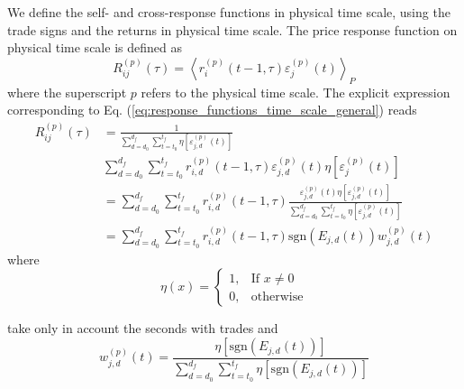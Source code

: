 We define the self- and cross-response functions in physical time scale, using
the trade signs and the returns in physical time scale. The price response
function on physical time scale is defined as
\begin{equation}\label{eq:response_functions_time_scale_general}
    R^{\left(p\right)}_{ij}\left(\tau\right)=\left\langle r^{\left(p\right)}
    _{i}\left(t-1, \tau\right) \varepsilon_{j}^{\left(p\right)} \left(t\right)
    \right\rangle _{P}
\end{equation}
where the superscript $p$ refers to the physical time scale. The explicit
expression corresponding to Eq.
(\ref{eq:response_functions_time_scale_general}) reads
\begin{align}\label{eq:response_seconds_explicit}
    R_{ij}^{\left(p\right)}\left(\tau\right)&=\frac{1}{\sum_{d=d_{0}}^{d_{f}}
    \sum_{t=t_{0}}^{t_{f}} \eta\left[ \varepsilon_{j,d}^{\left(p\right)}
    \left(t\right)\right]} \nonumber \\
    &\sum_{d=d_{0}}^{d_{f}} \sum_{t=t_{0}}^{t_{f}}
    r^{\left(p\right)}_{i,d}\left(t-1,\tau\right)
    \varepsilon_{j,d}^{\left(p\right)}\left(t\right)
    \eta\left[\varepsilon_{j}^{\left(p\right)} \left(t\right)\right] \\
    &=\sum_{d=d_{0}}^{d_{f}}\sum_{t=t_{0}}^{t_{f}}r^{\left(p\right)}_{i,d}
    \left(t-1,\tau\right) \frac{\varepsilon_{j,d}^{\left(p\right)}
    \left(t\right) \eta\left[\varepsilon_{j,d}^{\left(p\right)}
    \left( t\right)\right]} {\sum_{d=d_{0}}^{d_{f}}\sum_{t=t_{0}}^{t_{f}}\eta
    \left[\varepsilon_{j,d}^{\left(p\right)} \left(t\right)\right]} \nonumber\\
    &=\sum_{d=d_{0}}^{d_{f}}\sum_{t=t_{0}}^{t_{f}}r^{\left(p\right)}_{i,d}
    \left(t-1,\tau\right) \text{sgn}\left(E_{j,d}\left(t\right)\right)
    w_{j,d}^{\left(p\right)}\left(t\right)
\end{align}
where
\begin{equation}
    \eta\left(x\right)=\left\{ \begin{array}{cc}
    1, & \text{If }x\ne0 \\
    0, & \text{otherwise}
    \end{array}\right.
\end{equation}

take only in account the seconds with trades and
\begin{equation}
    w_{j,d}^{\left(p\right)}\left(t\right) = \frac{\eta\left[\text{sgn}
    \left(E_{j,d}\left( t\right)\right)\right]}{\sum_{d=d_{0}}^{d_{f}}
    \sum_{t=t_{0}}^{t_{f}} \eta\left[\text{sgn}\left(E_{j,d}
    \left(t\right)\right)\right]}
\end{equation}

